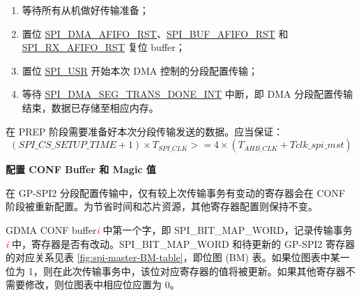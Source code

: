 \documentclass[main\_\_CN.tex]{subfiles}
\begin{document}
\begin{enumerate}
   \item 等待所有从机做好传输准备；

    \item 置位 \hyperref[fielddesc:SPIDMAAFIFORST]{SPI\_DMA\_AFIFO\_RST}、\hyperref[fielddesc:SPIBUFAFIFORST]{SPI\_BUF\_AFIFO\_RST} 和 \hyperref[fielddesc:SPIRXAFIFORST]{SPI\_RX\_AFIFO\_RST} 复位 buffer；

   \item 置位 \hyperref[fielddesc:SPIUSR]{SPI\_USR} 开始本次 DMA 控制的分段配置传输；

   \item 等待 \hyperref[int:SPIDMASEGTRANSDONEINT]{SPI\_DMA\_SEG\_TRANS\_DONE\_INT} 中断，即 DMA 分段配置传输结束，数据已存储至相应内存。
 \end{enumerate}

\begin{tiplisting}
\vspace{-2em}
在 PREP 阶段需要准备好本次分段传输发送的数据。应当保证：
\vspace{1em}
    \[
    (\hyperref[fielddesc:SPICSSETUPTIME]{SPI\_CS\_SETUP\_TIME} + 1) \times T_{SPI\_CLK} >= 4 \times (T_{AHB\_CLK} + Tclk\_spi\_mst)
    \]
\end{tiplisting}

\textbf{配置 CONF Buffer 和 Magic 值}\label{sec:SCT-CONF-Buffer}

在 GP-SPI2 分段配置传输中，仅有较上次传输事务有变动的寄存器会在 CONF 阶段被重新配置。为节省时间和芯片资源，其他寄存器配置则保持不变。

GDMA CONF buffer\textcolor{red}{\it i} 中第一个字，即 SPI\_BIT\_MAP\_WORD，记录传输事务 \textcolor{red}{\it i} 中，寄存器是否有改动。SPI\_BIT\_MAP\_WORD 和待更新的 GP-SPI2 寄存器的对应关系见表  \ref{fig:spi-master-BM-table}，即位图 (BM) 表。如果位图表中某一位为 1，则在此次传输事务中，该位对应寄存器的值将被更新。如果其他寄存器不需要修改，则位图表中相应位应置为 0。
\end{document}
